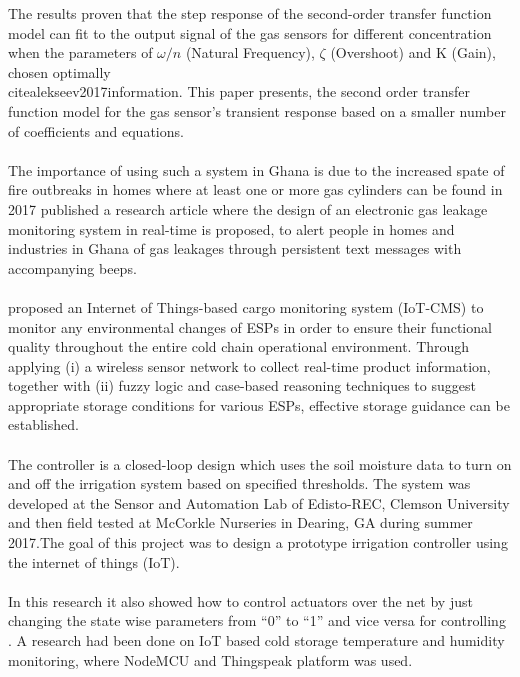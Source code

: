 The results proven that the step response of the second-order transfer function model can fit to the output signal of the gas sensors for different concentration when the parameters of $\omega/n$ (Natural Frequency), $\zeta$ (Overshoot) and K (Gain), chosen optimally\\cite{alekseev2017information}. This paper presents, the second order transfer function model for the gas sensor’s transient response based on a smaller number of coefficients and equations\cite{kukade2014electronic}.\\\\
The importance of using such a system in Ghana is due to the increased spate of fire outbreaks in homes where at least one or more gas cylinders can be found \cite{kwok2018smart} in 2017 published a research article where the design of an electronic gas leakage monitoring system in real-time is proposed, to alert people in homes and industries in Ghana of gas leakages through persistent text messages with accompanying beeps.\\\\
proposed \cite{karim2018monitoring} an Internet of Things-based cargo monitoring system (IoT-CMS) to monitor any environmental changes of ESPs in order to ensure their functional quality throughout the entire cold chain operational environment. Through applying (i) a wireless sensor network to collect real-time product information, together with (ii) fuzzy logic and case-based reasoning techniques to suggest appropriate storage conditions for various ESPs, effective storage guidance can be established\cite{amuzuvi2017design}.\\\\
The\cite{sethi2017internet} controller is a closed-loop design which uses the soil moisture data to turn on and off the irrigation system based on specified thresholds. The system was developed at the Sensor and Automation Lab of Edisto-REC, Clemson University and then field tested at McCorkle Nurseries in Dearing, GA during summer 2017\cite{tsang2017iot}.The goal of this project was to design a prototype irrigation controller using the internet of things (IoT).\\\\
In this research it also showed how to control actuators over the net by just changing the state wise parameters from “0” to “1” and vice versa for controlling \cite{jokar2016intrusion,}. A research had been done on IoT based cold storage temperature and humidity monitoring, where NodeMCU and Thingspeak platform was used.
